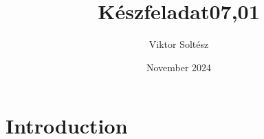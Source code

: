 \documentclass{article}
\title{Készfeladat07,01}
\author{Viktor Soltész}
\date{November 2024}
\begin{document}
\maketitle

\section{Introduction}
\end{document}
